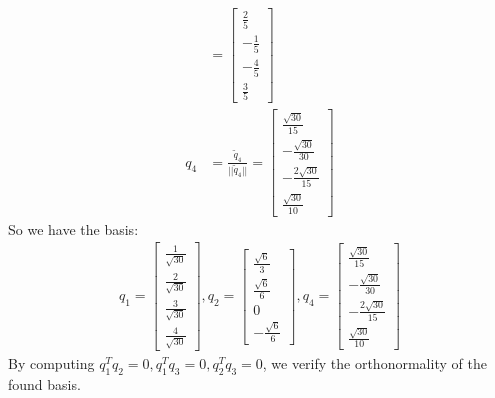 \documentclass[english,onecolumn]{IEEEtran}
\begin{document}
\begin{enumerate}
\begin{align*}
    &=\begin{bmatrix}
    \frac{2}{5} \\
    -\frac{1}{5} \\
    -\frac{4}{5}\\
    \frac{3}{5}
    \end{bmatrix}\\
    q_4 &= \frac{\tilde{q}_4}{||\tilde{q}_4||}=\begin{bmatrix}
    \frac{\sqrt{30}}{15} \\
    -\frac{\sqrt{30}}{30} \\
    -\frac{2\sqrt{30}}{15}\\
    \frac{\sqrt{30}}{10}
    \end{bmatrix}
    \end{align*}
    So we have the basis:
    \begin{align*}
    	q_1=\begin{bmatrix}
    \frac{1}{\sqrt{30}} \\
    \frac{2}{\sqrt{30}} \\
    \frac{3}{\sqrt{30}}\\
    \frac{4}{\sqrt{30}}
    \end{bmatrix},q_2=\begin{bmatrix}
    \frac{\sqrt{6}}{3} \\
    \frac{\sqrt{6}}{6} \\
    0\\
    -\frac{\sqrt{6}}{6}
    \end{bmatrix},q_4= \begin{bmatrix}
    \frac{\sqrt{30}}{15} \\
    -\frac{\sqrt{30}}{30} \\
    -\frac{2\sqrt{30}}{15}\\
    \frac{\sqrt{30}}{10}
    \end{bmatrix}
    \end{align*}
     By computing $q_1^Tq_2=0,q_1^Tq_3=0,q_2^Tq_3=0$, we verify the orthonormality of the found basis.
    

\end{enumerate}
\end{document}
